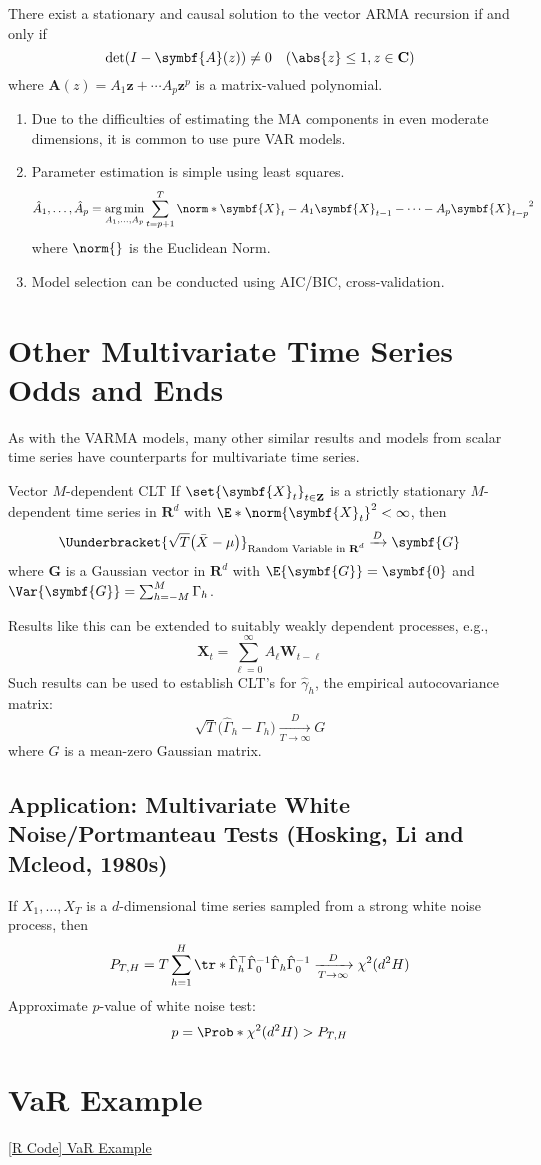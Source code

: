 \begin{Theorem}{}{}
    There exist a stationary and causal solution to the vector ARMA recursion if and only if
    \[ \det(I-\symbf{A}(z))\ne 0\quad(\abs{z}\le 1,z\in\mathbf{C}) \]
    where $ \symbf{A}(z)=A_1 \symbf{z}+\cdots A_p \symbf{z}^p $ is a matrix-valued polynomial.
\end{Theorem}
\begin{Remark}{}{}
    \begin{enumerate}[(1)]
        \item Due to the difficulties of estimating the MA components in even moderate dimensions,
              it is common to use pure VAR models.
        \item Parameter estimation is simple using least squares.
              \[ \hat{A}_1,\ldots,\hat{A}_p=\argmin_{A_1,\ldots,A_p}
                  \sum_{t=p+1}^{T}\norm*{\symbf{X}_t-A_1 \symbf{X}_{t-1}-\cdots -A_p \symbf{X}_{t-p}}^2  \]
              where $ \norm{} $ is the Euclidean Norm.
        \item Model selection can be conducted using AIC/BIC, cross-validation.
    \end{enumerate}
\end{Remark}
\section{Other Multivariate Time Series Odds and Ends}
As with the VARMA models, many other similar results and models
from scalar time series have counterparts for multivariate time series.
\begin{Theorem}{Vector $ M $-dependent CLT}{}
    If $ \set{\symbf{X}_t}_{t\in\mathbf{Z}} $ is a strictly stationary $ M $-dependent
    time series in $ \mathbf{R}^d $ with $ \E*{\norm{\symbf{X}_t}^2}<\infty $, then
    \[ \Uunderbracket{\sqrt{T}\bigl(\bar{X}-\mu\bigr)}_{\text{Random Variable in $ \mathbf{R}^d $}}\xrightarrow{D}\symbf{G} \]
    where $ \symbf{G} $ is a Gaussian vector in $ \mathbf{R}^d $
    with $ \E{\symbf{G}}=\symbf{0} $ and $ \Var{\symbf{G}}=\sum_{h=-M}^{M} \Gamma_h $.
\end{Theorem}
Results like this can be extended to suitably weakly dependent processes, e.g.,
\[ \symbf{X}_t=\sum_{\ell=0}^{\infty} A_\ell \symbf{W}_{t-\ell} \]
Such results can be used to establish CLT's for $ \hat{\gamma}_h $,
the empirical autocovariance matrix:
\[ \sqrt{T}\bigl(\hat{\Gamma}_h-\Gamma_h\bigr)\xrightarrow[T\to\infty]{D}G \]
where $ G $ is a mean-zero Gaussian matrix.
\subsection*{Application: Multivariate White Noise/Portmanteau Tests (Hosking, Li and Mcleod, 1980s)}
If $ X_1,\ldots,X_T $ is a $ d $-dimensional time series sampled from a strong white noise process, then
\[ P_{T,H}=T \sum_{h=1}^{H} \tr*{\hat{\Gamma}_h^\top \hat{\Gamma}_0^{-1}\hat{\Gamma}_h\hat{\Gamma}_0^{-1}}
    \xrightarrow[T\to\infty]{D}\chi^2(d^2 H) \]
Approximate $ p $-value of white noise test:
\[ p=\Prob*{\chi^2(d^2 H)>P_{T,H}} \]
\section{VaR Example}
\href{https://github.com/Hextical/university-notes/blob/master/year-3/semester-2/STAT 443/code/11.4 - VaR Example.R}{[R Code] VaR Example}
